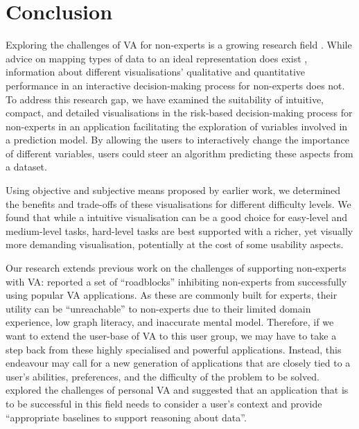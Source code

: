 \documentclass[final,5p,times,twocolumn,authoryear]{elsarticle}
\newcommand{\q}[1]{``#1''}
\begin{document}
\section{Conclusion} %
\label{sec:conclusion}


Exploring the challenges of VA for non-experts is a growing research field \citep{kwon2011visual}. While advice on mapping types of data to an ideal representation does exist \citep{Wongsuphasawat2016}, information about different visualisations' qualitative and quantitative performance in an interactive decision-making process for non-experts does not. To address this research gap, we have examined the suitability of intuitive, compact, and detailed visualisations in the risk-based decision-making process for non-experts in an application facilitating the exploration of variables involved in a prediction model. By allowing the users to interactively change the importance of different variables, users could steer an algorithm predicting these aspects from a dataset.

Using objective and subjective means proposed by earlier work, we determined the benefits and trade-offs of these visualisations for different difficulty levels. We found that while a intuitive visualisation can be a good choice for easy-level and medium-level tasks, hard-level tasks are best supported with a richer, yet visually more demanding visualisation, potentially at the cost of some usability aspects. 

Our research extends previous work on the challenges of supporting non-experts with VA: \cite{kwon2011visual} reported a set of \q{roadblocks} inhibiting non-experts from successfully using popular VA applications. As these are commonly built for experts, their utility can be \q{unreachable} to non-experts due to their limited domain experience, low graph literacy, and inaccurate mental model. Therefore, if we want to extend the user-base of VA to this user group, we may have to take a step back from these highly specialised and powerful applications. Instead, this endeavour may call for a new generation of applications that are closely tied to a user's abilities, preferences, and the difficulty of the problem to be solved. \cite{huang2015personal} explored the challenges of personal VA and suggested that an application that is to be successful in this field needs to consider a user's context and provide \q{appropriate baselines to support reasoning about data}.
\end{document}

